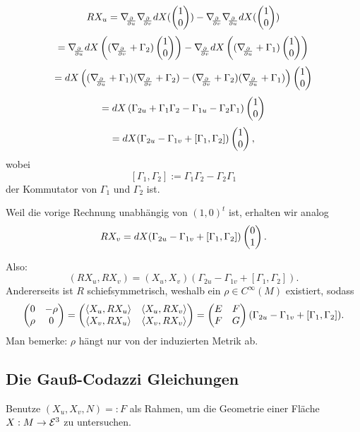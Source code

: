 		\[ RX_u = \D{u}\D v dX(\pmat{1 \\ 0}) - \D v \D u dX(\pmat{1\\0}) \]
		\[ = \D u dX\left((\D v + \Gamma_2) \pmat{1 \\ 0}\right) - \D v dX \left( (\D u + \Gamma_1)\pmat{1\\0}  \right) \]
		\[ = dX\left((\D u + \Gamma_1)(\D v + \Gamma_2)-(\D v + \Gamma_2) (\D u + \Gamma_{1} )\right) \pmat{1 \\ 0} \]
		\[ = dX\left( \Gamma_{2u} + \Gamma_1\Gamma_2 - \Gamma_{1u} - \Gamma_{2}\Gamma_{1} \right) \begin{pmatrix} 1 \\ 0 \end{pmatrix} \]
		\[ = dX (\Gamma_{2u}-\Gamma_{1v} + [\Gamma_{1},\Gamma_{2}]) \begin{pmatrix} 1 \\ 0 \end{pmatrix}, \]
	wobei 
		\[ [\Gamma_1 , \Gamma_2] := \Gamma_1 \Gamma_2 - \Gamma_2 \Gamma_1 \]
	der Kommutator von $\Gamma_1 $ und $\Gamma_2$ ist.  
	
	Weil die vorige Rechnung unabhängig von $(1,0)^t$ ist, erhalten wir analog
		\[ RX_v = dX (\Gamma_{2u}-\Gamma_{1v} + [\Gamma_{1},\Gamma_{2}])\begin{pmatrix} 0 \\ 1 \end{pmatrix}. \]
		
	Also: 
		\[ (RX_u,RX_v) = ( X_u,X_v )(\Gamma_{2u}-\Gamma_{1v} + [\Gamma_{1},\Gamma_{2}]). \]
	Andererseits ist $R$ schiefsymmetrisch, weshalb ein $ \rho \in C^\infty(M) $ existiert, sodass
		\[ \begin{pmatrix} 0 & -\rho \\ \rho & 0 \end{pmatrix} = \begin{pmatrix} \left \langle X_u,RX_u \right\rangle &\left \langle X_u,RX_v \right\rangle \\ \left \langle X_v,RX_u \right\rangle & \left \langle X_v,RX_v \right\rangle  \end{pmatrix} = \begin{pmatrix} E & F \\ F & G \end{pmatrix}(\Gamma_{2u}-\Gamma_{1v} + [ \Gamma_{1},\Gamma_{2} ]). \]
	Man bemerke:
	$ \rho $ hängt nur von der induzierten Metrik ab.
	
\subsection{Die Gauß-Codazzi Gleichungen}

	Benutze $ (X_u,X_v,N) =: F $ als Rahmen, um die Geometrie einer Fläche $ X:M\rightarrow\mathcal E^3 $ zu untersuchen.

